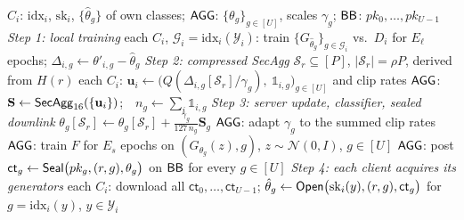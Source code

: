 \begin{algorithm}[t]
\caption{Training round $r=1,\dots,R$ (Fig.~\ref{fig:round})}
\label{alg:round}
\begin{algorithmic}[1]
\Require $C_i$: $\mathrm{idx}_i$, $\mathrm{sk}_i$, $\{\hat\theta_g\}$ of own classes; $\mathsf{AGG}$: $\{\theta_g\}_{g\in[U]}$, scales $\gamma_g$; $\mathsf{BB}$: $pk_0,\dots,pk_{U-1}$
\Statex \textit{Step 1: local training}
\State each $C_i$, $\mathcal{G}_i=\mathrm{idx}_i(\mathcal{Y}_i)$: train $\{G_{\hat\theta_g}\}_{g\in\mathcal{G}_i}$ vs.\ $D_i$ for $E_\ell$ epochs; $\Delta_{i,g}\gets\theta'_{i,g}-\hat\theta_g$
\Statex \textit{Step 2: compressed SecAgg}
\State $\mathcal{S}_r\subseteq[P]$, $|\mathcal{S}_r|=\rho P$, derived from $H(r)$ 
\State each $C_i$: $\mathbf{u}_i\gets\big(Q(\Delta_{i,g}[\mathcal{S}_r]/\gamma_g),\ \mathbb{1}_{i,g}\big)_{g\in[U]}$ and clip rates 
\State $\mathsf{AGG}$: $\mathbf{S}\gets\mathsf{SecAgg}_{16}(\{\mathbf{u}_i\})$;\ \ $n_g\gets\sum_i\mathbb{1}_{i,g}$
\Statex \textit{Step 3: server update, classifier, sealed downlink}
  \State $\theta_g[\mathcal{S}_r]\gets\theta_g[\mathcal{S}_r]+\frac{\gamma_g}{127\,n_g}\mathbf{S}_g$ 
\EndFor
\State $\mathsf{AGG}$: adapt $\gamma_g$ to the summed clip rates
\State $\mathsf{AGG}$: train $F$ for $E_s$ epochs on $(G_{\theta_g}(z),g)$, $z\sim\mathcal{N}(0,I)$, $g\in[U]$
\State $\mathsf{AGG}$: post $\mathsf{ct}_g\gets\mathsf{Seal}\big(pk_g,(r,g),\theta_g\big)$ on $\mathsf{BB}$ for every $g\in[U]$
\Statex \textit{Step 4: each client acquires its generators}
\State each $C_i$: download all $\mathsf{ct}_0,\dots,\mathsf{ct}_{U-1}$; $\hat\theta_g\gets\mathsf{Open}\big(\mathrm{sk}_i(y),(r,g),\mathsf{ct}_g\big)$ for $g=\mathrm{idx}_i(y)$, $y\in\mathcal{Y}_i$
\end{algorithmic}
\end{algorithm}
